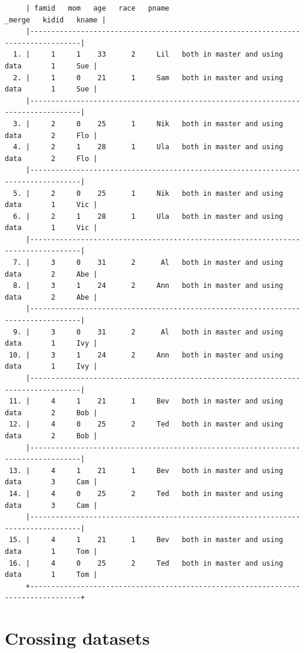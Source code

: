 \documentclass[
]{book}
\begin{document}
\begin{verbatim}
     | famid   mom   age   race   pname                          _merge   kidid   kname |
     |----------------------------------------------------------------------------------|
  1. |     1     1    33      2     Lil   both in master and using data       1     Sue |
  2. |     1     0    21      1     Sam   both in master and using data       1     Sue |
     |----------------------------------------------------------------------------------|
  3. |     2     0    25      1     Nik   both in master and using data       2     Flo |
  4. |     2     1    28      1     Ula   both in master and using data       2     Flo |
     |----------------------------------------------------------------------------------|
  5. |     2     0    25      1     Nik   both in master and using data       1     Vic |
  6. |     2     1    28      1     Ula   both in master and using data       1     Vic |
     |----------------------------------------------------------------------------------|
  7. |     3     0    31      2      Al   both in master and using data       2     Abe |
  8. |     3     1    24      2     Ann   both in master and using data       2     Abe |
     |----------------------------------------------------------------------------------|
  9. |     3     0    31      2      Al   both in master and using data       1     Ivy |
 10. |     3     1    24      2     Ann   both in master and using data       1     Ivy |
     |----------------------------------------------------------------------------------|
 11. |     4     1    21      1     Bev   both in master and using data       2     Bob |
 12. |     4     0    25      2     Ted   both in master and using data       2     Bob |
     |----------------------------------------------------------------------------------|
 13. |     4     1    21      1     Bev   both in master and using data       3     Cam |
 14. |     4     0    25      2     Ted   both in master and using data       3     Cam |
     |----------------------------------------------------------------------------------|
 15. |     4     1    21      1     Bev   both in master and using data       1     Tom |
 16. |     4     0    25      2     Ted   both in master and using data       1     Tom |
     +----------------------------------------------------------------------------------+
\end{verbatim}

\section{Crossing datasets}\label{crossing-datasets}
\end{document}

